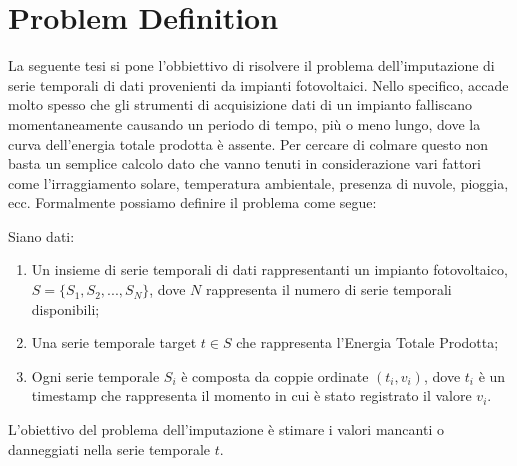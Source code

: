 \section{Problem Definition}
La seguente tesi si pone l'obbiettivo di risolvere il problema dell'imputazione
di serie temporali di dati provenienti da impianti fotovoltaici. Nello
specifico, accade molto spesso che gli strumenti di acquisizione dati di un
impianto falliscano momentaneamente causando un periodo di tempo, più o meno
lungo, dove la curva dell'energia totale prodotta è assente. Per cercare di
colmare questo  non basta un semplice calcolo dato che vanno tenuti in
considerazione vari fattori come l'irraggiamento solare, temperatura ambientale,
presenza di nuvole, pioggia, ecc.
Formalmente possiamo definire il problema come segue:

\begin{definition}
    Siano dati:
    \begin{enumerate}
        \item  Un insieme di serie temporali di dati rappresentanti un impianto
              fotovoltaico, $S = \{S_1, S_2, ..., S_N\}$, dove $N$ rappresenta
              il numero di serie temporali disponibili;
        \item Una serie temporale target $t \in S$ che rappresenta l'Energia
              Totale Prodotta;
        \item Ogni serie temporale $S_i$ è composta da coppie ordinate $(t_i, v_i)$,
              dove $t_i$ è un timestamp che rappresenta il momento in cui è stato
              registrato il valore $v_i$.
    \end{enumerate}

    L'obiettivo del problema dell'imputazione è stimare i valori mancanti o
    danneggiati nella serie temporale $t$.
\end{definition}







